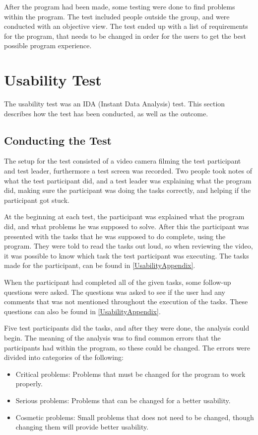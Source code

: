 After the program had been made, some testing were done to find problems within the program. The test included people outside the group, and were conducted with an objective view. The test ended up with a list of requirements for the program, that needs to be changed in order for the users to get the best possible program experience.

\section{Usability Test}\label{UsabilityTestSection}
The usability test was an IDA (Instant Data Analysis) test\cite{IDASlides}. This section describes how the test has been conducted, as well as the outcome.

\subsection{Conducting the Test}

The setup for the test consisted of a video camera filming the test participant and test leader, furthermore a test screen  was recorded. Two people took notes of what the test participant did, and a test leader was explaining what the program did, making sure the participant was doing the tasks correctly, and helping if the participant got stuck.

At the beginning at each test, the participant was explained what the program did, and what problems he was supposed to solve. After this the participant was presented with the tasks that he was supposed to do complete, using the program. They were told to read the tasks out loud, so when reviewing the video, it was possible to know which task the test participant was executing. The tasks made for the participant, can be found in \cref{UsabilityAppendix}.

When the participant had completed all of the given tasks, some follow-up questions were asked. The questions was asked to see if the user had any comments that was not mentioned throughout the execution of the tasks. These questions can also be found in \cref{UsabilityAppendix}.

Five test participants did the tasks, and after they were done, the analysis could begin. The meaning of the analysis was to find common errors that the participants had within the program, so these could be changed. The errors were divided into categories of the following:

\begin{itemize}
    \item Critical problems: Problems that must be changed for the program to work properly.
    \item Serious problems: Problems that can be changed for a better usability.
    \item Cosmetic problems: Small problems that does not need to be changed, though changing them will provide better usability.
\end{itemize}

